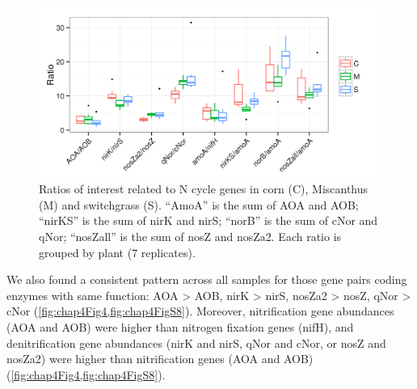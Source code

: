 \documentclass[]{msu-thesis}
\begin{document}
\begin{figure}[tbph!]
  \centering
  \includegraphics[scale=1]{figs/chap4-xander-ncycle-ratio}
  \caption[Ratios of interest related to N cycle genes]{Ratios of interest related to N cycle genes in corn (C), Miscanthus (M) and switchgrass (S). ``AmoA'' is the sum of AOA and AOB; ``nirKS'' is the sum of nirK and nirS; ``norB'' is the sum of cNor and qNor; ``nosZall'' is the sum of nosZ and nosZa2. Each ratio is grouped by plant (7 replicates).}
  \label{fig:chap4FigS8}
\end{figure}



We also found a consistent pattern across all samples for those gene pairs coding enzymes with same function: AOA > AOB, nirK > nirS, nosZa2 > nosZ, qNor > cNor (\cref{fig:chap4Fig4,fig:chap4FigS8}). Moreover, nitrification gene abundances (AOA and AOB) were higher than nitrogen fixation genes (nifH), and denitrification gene abundances (nirK and nirS, qNor and cNor, or nosZ and nosZa2) were higher than nitrification genes (AOA and AOB) (\cref{fig:chap4Fig4,fig:chap4FigS8}).
\end{document}
